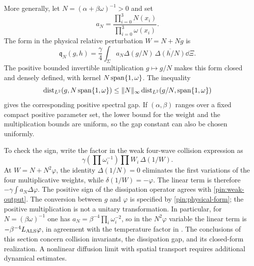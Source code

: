 More generally, let $N=(\alpha+\beta\omega)^{-1}>0$ and set
\begin{equation}
                         a_N=\frac{\prod_{i=0}^3N(x_i)}
                                          {\prod_{i=0}^3\omega(x_i)}.
 \label{pin:physical-weight}
\end{equation}
The form in the physical relative perturbation $W=N+Ng$ is
\begin{equation}
 \mathfrak q_N(g,h)=\frac\gamma4
     \int_\Sigma a_N\Delta(g/N)\,\overline{\Delta(h/N)}\dd\Xi.
 \label{pin:physical-form}
\end{equation}
The positive bounded invertible multiplication $g\mapsto g/N$ makes
this form closed and densely defined, with kernel
$N\operatorname{span}\{1,\omega\}$. The inequality
\[
 \operatorname{dist}_{L^2}(g,N\operatorname{span}\{1,\omega\})
       \le\|N\|_\infty
          \operatorname{dist}_{L^2}(g/N,\operatorname{span}\{1,\omega\})
\]
gives the corresponding positive spectral gap. If $(\alpha,\beta)$
ranges over a fixed compact positive parameter set, the lower bound
for the weight and the multiplication bounds are uniform, so the gap
constant can also be chosen uniformly.

To check the sign, write the factor in the weak four-wave collision expression as
\[
 \gamma(\prod\omega_i^{-1})\prod W_i\,\Delta(1/W).
\]
At $W=N+N^2\varphi$, the identity $\Delta(1/N)=0$ eliminates the
first variations of the four multiplicative weights, while
$\delta(1/W)=-\varphi$. The linear term is therefore
$-\gamma\int a_N\Delta\varphi$. The positive sign of the dissipation
operator agrees with \eqref{pin:weak-output}. The conversion between
$g$ and $\varphi$ is specified by \eqref{pin:physical-form}; the
positive multiplication is not a unitary transformation. In particular,
for $N=(\beta\omega)^{-1}$ one has
$a_N=\beta^{-4}\prod_i\omega_i^{-2}$, so in the $N^2\varphi$
variable the linear term is $-\beta^{-4}L_{\rm ALS}\varphi$, in
agreement with the temperature factor in
\cite[equation (3.20)]{ALS2006}.
The conclusions of this section concern collision invariants, the
dissipation gap, and its closed-form realization. A nonlinear diffusion
limit with spatial transport requires additional dynamical estimates.
